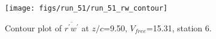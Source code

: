 \begin{figure}[H]
\centering
\texttt{[image: figs/run\_51/run\_51\_rw\_contour]}
\caption{Contour plot of $\overline{r^\prime w^\prime}$ at $z/c$=9.50, $V_{free}$=15.31, station 6.}
\label{fig:run_51_rw_contour}
\end{figure}


